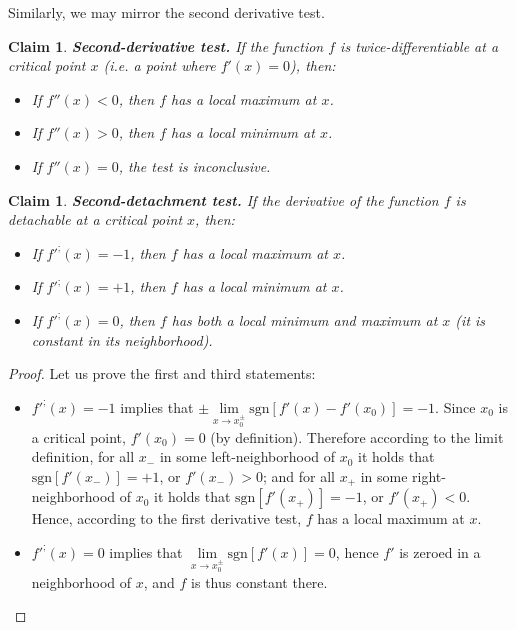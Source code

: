 \documentclass[11pt]{book}
\newtheorem{clm}[thm]{Claim}
\begin{document}
Similarly, we may mirror the second derivative test.
\begin{clm}\textbf{Second-derivative test. }If the function $f$ is twice-differentiable
at a critical point $x$ (i.e. a point where $f'\left(x\right)=0$),
then:
\begin{itemize}
\item If $f''\left(x\right)<0$, then $f$ has a local maximum at $x$.
\item If $f''\left(x\right)>0$, then $f$ has a local minimum at $x$.
\item If $f''\left(x\right)=0$, the test is inconclusive.
\end{itemize}
\label{second_derivative_test}
\end{clm}
\begin{clm}\textbf{Second-detachment test. }If the derivative of the function $f$
is detachable at a critical point $x$, then:
\begin{itemize}
\item If $f'^{;}\left(x\right)=-1$, then $f$ has a local maximum at $x$.
\item If $f'^{;}\left(x\right)=+1$, then $f$ has a local minimum at $x$.
\item If $f'^{;}\left(x\right)=0$, then $f$ has both a local minimum and
maximum at $x$ (it is constant in its neighborhood).
\end{itemize}
\label{second_detachment_test}
\end{clm}
\begin{proof}Let us prove the first and third statements:
\begin{itemize}
\item $f'^{;}\left(x\right)=-1$ implies that $\pm\underset{x\to x_{0}^{\pm}}{\lim}\text{sgn}\left[f'\left(x\right)-f'\left(x_{0}\right)\right]=-1$.
Since $x_{0}$ is a critical point, $f'\left(x_{0}\right)=0$ (by
definition). Therefore according to the limit definition, for all
$x_{-}$ in some left-neighborhood of $x_{0}$ it holds that $\text{sgn}\left[f'\left(x_{-}\right)\right]=+1$,
or $f'\left(x_{-}\right)>0$; and for all $x_{+}$ in some right-neighborhood
of $x_{0}$ it holds that $\text{sgn}\left[f'\left(x_{+}\right)\right]=-1$,
or $f'\left(x_{+}\right)<0$. Hence, according to the first derivative
test, $f$ has a local maximum at $x$.
\item $f'^{;}\left(x\right)=0$ implies that $\underset{x\to x_{0}^{\pm}}{\lim}\text{sgn}\left[f'\left(x\right)\right]=0$,
hence $f'$ is zeroed in a neighborhood of $x$, and $f$ is thus
constant there.
\end{itemize}
\end{proof}
\end{document}
